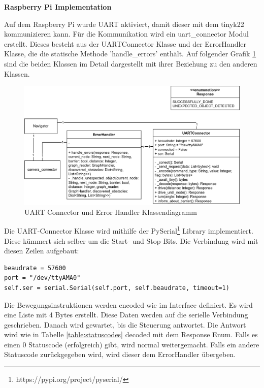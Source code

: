 \textbf{Raspberry Pi Implementation}

Auf dem Raspberry Pi wurde UART aktiviert, damit dieser mit dem \gls{tinyk22} kommunizieren kann.
Für die Kommunikation wird ein uart\_connector Modul erstellt. Dieses besteht aus der UARTConnector Klasse und der ErrorHandler Klasse, die die statische Methode 'handle\_errors' enthält. Auf folgender Grafik \ref{fig:uart-connector-nav} sind die beiden Klassen im Detail dargestellt mit ihrer Beziehung zu den anderen Klassen.

\begin{figure}[H]
\centering
\includegraphics[width=\textwidth]{assets/IT/robot-sw-architecture-uart-connector.png}
\caption{UART Connector und Error Handler Klassendiagramm}
\label{fig:uart-connector-nav}
\end{figure}

Die UART-Connector Klasse  wird mithilfe der PySerial\footnote{https://pypi.org/project/pyserial/} Library implementiert. Diese kümmert sich selber um die Start- und Stop-Bits.
Die Verbindung wird mit diesen Zeilen aufgebaut:

\begin{verbatim}
beaudrate = 57600
port = "/dev/ttyAMA0"
self.ser = serial.Serial(self.port, self.beaudrate, timeout=1)
\end{verbatim}

Die Bewegungsinstruktionen werden encoded wie im Interface definiert. Es wird eine Liste mit 4 Bytes erstellt.
Diese Daten werden auf die serielle Verbindung geschrieben.
Danach wird gewartet, bis die Steuerung antwortet. Die Antwort wird wie in Tabelle \ref{table:statuscodes} decoded mit dem Response Enum.
Falls es einen 0 Statuscode (erfolgreich) gibt, wird normal weitergemacht. Falls ein andere Statuscode zurückgegeben wird, wird dieser dem ErrorHandler übergeben.

